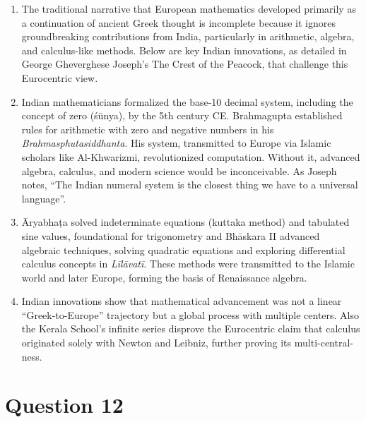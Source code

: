 \documentclass{article}
\begin{document}
\begin{enumerate}
    \item The traditional narrative that European mathematics developed primarily as a continuation of ancient Greek thought is incomplete because it ignores groundbreaking contributions from India, particularly in arithmetic, algebra, and calculus-like methods. Below are key Indian innovations, as detailed in George Gheverghese Joseph’s The Crest of the Peacock, that challenge this Eurocentric view.
    \item Indian mathematicians formalized the base-10 decimal system, including the concept of zero (śūnya), by the 5th century CE. Brahmagupta established rules for arithmetic with zero and negative numbers in his \textit{Brahmasphutasiddhanta}. His system, transmitted to Europe via Islamic scholars like Al-Khwarizmi, revolutionized computation. Without it, advanced algebra, calculus, and modern science would be inconceivable. As Joseph notes, “The Indian numeral system is the closest thing we have to a universal language”. \cite{joseph1991crest}
    \item Āryabhaṭa solved indeterminate equations (kuttaka method) and tabulated sine values, foundational for trigonometry and Bhāskara II advanced algebraic techniques, solving quadratic equations and exploring differential calculus concepts in \textit{Līlāvatī}. These methods were transmitted to the Islamic world and later Europe, forming the basis of Renaissance algebra. \cite{joseph1991crest}
    \item Indian innovations show that mathematical advancement was not a linear “Greek-to-Europe” trajectory but a global process with multiple centers. Also the Kerala School’s infinite series disprove the Eurocentric claim that calculus originated solely with Newton and Leibniz, further proving its multi-central-ness.
\end{enumerate}

\newpage

\section*{Question 12}
\end{document}
